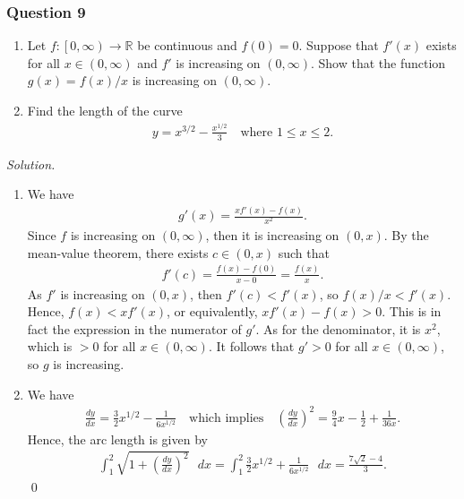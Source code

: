 \documentclass[12pt]{article}
\begin{document}
\subsubsection*{Question 9}
\begin{enumerate}[label=\textbf{(\alph*)}]
    \itemsep 0em 
    \item Let $f:\left[0,\infty\right)\rightarrow\mathbb{R}$ be continuous and $f\left(0\right)=0$. Suppose that $f'\left(x\right)$ exists for all $x\in\left(0,\infty\right)$ and $f'$ is increasing on $\left(0,\infty\right)$. Show that the function $g\left(x\right)=f\left(x\right)/x$ is increasing on $\left(0,\infty\right)$.
\item Find the length of the curve \begin{align*}
    y=x^{3/2}-\frac{x^{1/2}}{3}\quad\text{where }1\le x\le 2.
\end{align*}
\end{enumerate}
\textit{Solution.}
\begin{enumerate}[label=\textbf{(\alph*)}]
    \itemsep 0em
    \item We have \begin{align*}
        g'\left(x\right)=\frac{xf'\left(x\right)-f\left(x\right)}{x^2}.
    \end{align*}
    Since $f$ is increasing on $\left(0,\infty\right)$, then it is increasing on $\left(0,x\right)$. By the mean-value theorem, there exists $c\in \left(0,x\right)$ such that \begin{align*}
        f'\left(c\right)=\frac{f\left(x\right)-f\left(0\right)}{x-0}=\frac{f\left(x\right)}{x}.
    \end{align*}
    As $f'$ is increasing on $\left(0,x\right)$, then $f'\left(c\right)<f'\left(x\right)$, so $f\left(x\right)/x<f'\left(x\right)$. Hence, $f\left(x\right)<xf'\left(x\right)$, or equivalently, $xf'\left(x\right)-f\left(x\right)>0$. This is in fact the expression in the numerator of $g'$. As for the denominator, it is $x^2$, which is $>0$ for all $x\in \left(0,\infty\right)$. It follows that $g'>0$ for all $x\in\left(0,\infty\right)$, so $g$ is increasing.
    \item We have \begin{align*}
        \frac{dy}{dx}=\frac{3}{2}x^{1/2}-\frac{1}{6x^{1/2}}\quad\text{which implies}\quad \left(\frac{dy}{dx}\right)^2=\frac{9}{4}x-\frac{1}{2}+\frac{1}{36x}.
    \end{align*}
    Hence, the arc length is given by \begin{align*}
        \int_{1}^{2}\sqrt{1+\left(\frac{dy}{dx}\right)^2}\text{ }dx=\int_{1}^{2}\frac{3}{2}x^{1/2}+\frac{1}{6x^{1/2}}\text{ }dx=\frac{7\sqrt{2}-4}{3}.
    \end{align*}\qed 
\end{enumerate}
\end{document}
